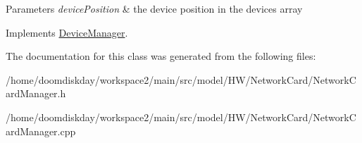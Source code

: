 \begin{DoxyParams}{Parameters}
{\em device\+Position} & the device position in the devices array \\
\hline
\end{DoxyParams}


Implements \hyperlink{classDeviceManager_ae367c6847b2988cf6249cbf6254261cb}{Device\+Manager}.



The documentation for this class was generated from the following files\+:\begin{DoxyCompactItemize}
\item 
/home/doomdiskday/workspace2/main/src/model/\+H\+W/\+Network\+Card/Network\+Card\+Manager.\+h\item 
/home/doomdiskday/workspace2/main/src/model/\+H\+W/\+Network\+Card/Network\+Card\+Manager.\+cpp\end{DoxyCompactItemize}
